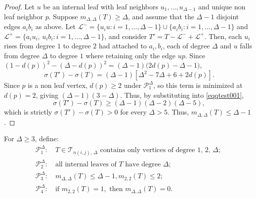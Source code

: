 \documentclass[12pt]{amsart}
\newcommand{\TT}{\mathcal{T}}
\begin{document}
\begin{proof}
Let $u$ be an internal leaf with leaf neighbors $u_1,\dots,u_{\Delta-1}$ and unique non leaf neighbor $p$. Suppose
$m_{\Delta,\Delta}(T)\geqslant\Delta$, and assume that the $\Delta-1$ disjoint edges $a_ib_i$ as above. Let
$\mathcal L^-=\{u_iu: i=1,\dots,\Delta-1\}\cup\{a_ib_i:i=1,\dots,\Delta-1\}$ and
$\mathcal L^+=\{a_iu_i,\,u_ib_i:i=1,\dots,\Delta-1\}$, and consider $T'=T-\mathcal L^-+\mathcal L^+$. Then, each $u_i$ rises from degree $1$ to degree $2$ had attached to $a_i,b_i$, each of
degree $\Delta$ and $u$ falls from degree $\Delta$ to degree $1$ where retaining only the edge $up$. Since $(1-d(p))^2-(\Delta-d(p))^2=(\Delta-1)\bigl(2d(p)-\Delta-1\bigr)$, 
\begin{equation}~\label{eqqtest001}
\sigma(T')-\sigma(T)=(\Delta-1)\left[\Delta^2-7\Delta+6+2d(p)\right].
\end{equation}
Since $p$ is a non leaf vertex, $d(p)\geqslant 2$ under $\mathcal P_1^\Delta$, so this term is minimized
 at $d(p)=2$, giving $(\Delta-1)(3-\Delta)$. Thus, by substituting into \eqref{eqqtest001},
\begin{equation}~\label{eqqtest002}
\sigma(T')-\sigma(T)\geqslant (\Delta-1)(\Delta-2)(\Delta-5),
\end{equation}
which is strictly $\sigma(T')-\sigma(T)>0$ for every $\Delta>5$. Thus, $m_{\Delta,\Delta}(T)\leqslant \Delta-1$.
\end{proof}


For $\Delta\ge3$, define:
\begin{align*}
\mathcal P_1^\Delta :&\ T\in \TT_{n(i,j),\,\Delta} \text{ contains only vertices of degree } 1,\,2,\,\Delta;\\
\mathcal P_2^\Delta :&\ \text{all internal leaves of } T \text{ have degree } \Delta;\\
\mathcal P_3^\Delta :&\ m_{\Delta,\Delta}(T)\le\Delta-1,  m_{2,2}(T)\leqslant 2;\\
\mathcal P_4^\Delta:&\ \text{if } m_{2,2}(T)=1, \text{ then } m_{\Delta,\Delta}(T)=0.
\end{align*}
 
\end{document}
